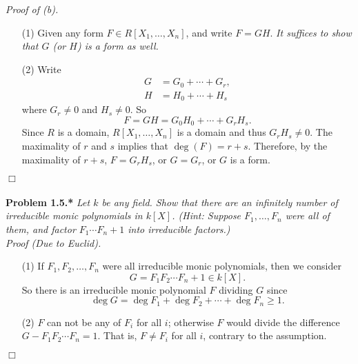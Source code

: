 \documentclass{article}
\begin{document}
\emph{Proof of (b).}
\begin{enumerate}
\item[(1)]
  Given any form $F \in R[X_1,\ldots,X_n]$, and write $F = GH$.
  \emph{It suffices to show that $G$ (or $H$) is a form as well.}

\item[(2)]
  Write
  \begin{align*}
    G &= G_0+\cdots+G_r, \\
    H &= H_0+\cdots+H_s
  \end{align*}
  where $G_r \neq 0$ and $H_s \neq 0$.
  So
  \[
    F = GH = G_0H_0 + \cdots + G_r H_s.
  \]
  Since $R$ is a domain, $R[X_1,\ldots,X_n]$ is a domain and thus $G_r H_s \neq 0$.
  The maximality of $r$ and $s$ implies that $\deg(F) = r+s$.
  Therefore, by the maximality of $r+s$,
  $F = G_r H_s$, or $G = G_r$, or $G$ is a form.
\end{enumerate}
$\Box$\\\\






\textbf{Problem 1.5.*}
\emph{Let $k$ be any field.
Show that there are an infinitely number of irreducible monic polynomials in $k[X]$.
(Hint: Suppose $F_1,\ldots,F_n$ were all of them, and factor $F_1\cdots F_n+1$ into irreducible factors.)} \\

\emph{Proof (Due to Euclid).}
\begin{enumerate}
\item[(1)]
  If
  $F_1, F_2, \ldots, F_n$ were all irreducible monic polynomials, then
  we consider
  \[
    G = F_1 F_2 \cdots F_n + 1 \in k[X].
  \]
  So there is an irreducible monic polynomial $F$ dividing $G$
  since
  \[
    \deg G = \deg F_1 + \deg F_2 + \cdots + \deg F_n \geq 1.
  \]

\item[(2)]
  $F$ can not be any of $F_i$ for all $i$;
  otherwise $F$ would divide the difference $G - F_1 F_2 \cdots F_n = 1$.
  That is, $F \neq F_i$ for all $i$, contrary to the assumption.
\end{enumerate}
$\Box$\\\\



\end{document}
